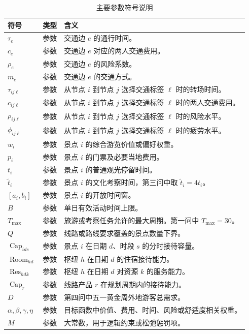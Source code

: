 \documentclass[UTF8,zihao=-4,a4paper]{ctexart}
\begin{document}
\begin{table}[htbp]
    \centering
    \caption{主要参数符号说明}
    \label{tab:notation_parameters}
    \small
    \renewcommand{\arraystretch}{1.18}
    \setlength{\tabcolsep}{5pt}
    \begin{tabularx}{\textwidth}{L{3.2cm} L{3.0cm} Y}
        \toprule
        符号 & 类型 & 含义 \\
        \midrule
        $\tau_e$ & 参数 & 交通边 $e$ 的通行时间。 \\
        $c_e$ & 参数 & 交通边 $e$ 对应的两人交通费用。 \\
        $\rho_e$ & 参数 & 交通边 $e$ 的风险系数。 \\
        $m_e$ & 参数 & 交通边 $e$ 的交通方式。 \\
        $\tau_{ij\ell}$ & 参数 & 从节点 $i$ 到节点 $j$ 选择交通标签 $\ell$ 时的转场时间。 \\
        $c_{ij\ell}$ & 参数 & 从节点 $i$ 到节点 $j$ 选择交通标签 $\ell$ 时的两人交通费用。 \\
        $\rho_{ij\ell}$ & 参数 & 从节点 $i$ 到节点 $j$ 选择交通标签 $\ell$ 时的风险水平。 \\
        $\phi_{ij\ell}$ & 参数 & 从节点 $i$ 到节点 $j$ 选择交通标签 $\ell$ 时的疲劳水平。 \\
        $w_i$ & 参数 & 景点 $i$ 的综合游览价值或偏好权重。 \\
        $p_i$ & 参数 & 景点 $i$ 的门票及必要当地费用。 \\
        $t_i$ & 参数 & 景点 $i$ 的普通观光停留时间。 \\
        $\tilde{t}_i$ & 参数 & 景点 $i$ 的文化考察时间，第三问中取 $\tilde{t}_i=4t_i$。 \\
        $[a_i,b_i]$ & 参数 & 景点 $i$ 的开放时间窗。 \\
        $B$ & 参数 & 单日有效活动时间上限。 \\
        $T_{\max}$ & 参数 & 旅游或考察任务允许的最大周期。第一问中 $T_{\max}=30$。 \\
        $Q$ & 参数 & 线路或路线要求覆盖的景点数量下界。 \\
        $\operatorname{Cap}_{i d s}$ & 参数 & 景点 $i$ 在日期 $d$、时段 $s$ 的分时接待容量。 \\
        $\operatorname{Room}_{h d}$ & 参数 & 枢纽 $h$ 在日期 $d$ 的住宿接待能力。 \\
        $\operatorname{Res}_{h d k}$ & 参数 & 枢纽 $h$ 在日期 $d$ 对资源 $k$ 的服务能力。 \\
        $\operatorname{Cap}_{r}$ & 参数 & 线路产品 $r$ 在规划周期内的接待能力。 \\
        $D$ & 参数 & 第四问中五一黄金周外地游客总需求。 \\
        $\alpha,\beta,\gamma,\eta$ & 参数 & 目标函数中价值、费用、时间、风险或舒适度相关权重。 \\
        $M$ & 参数 & 大常数，用于逻辑约束或松弛惩罚项。 \\
        \bottomrule
    \end{tabularx}
\end{table}
\end{document}
